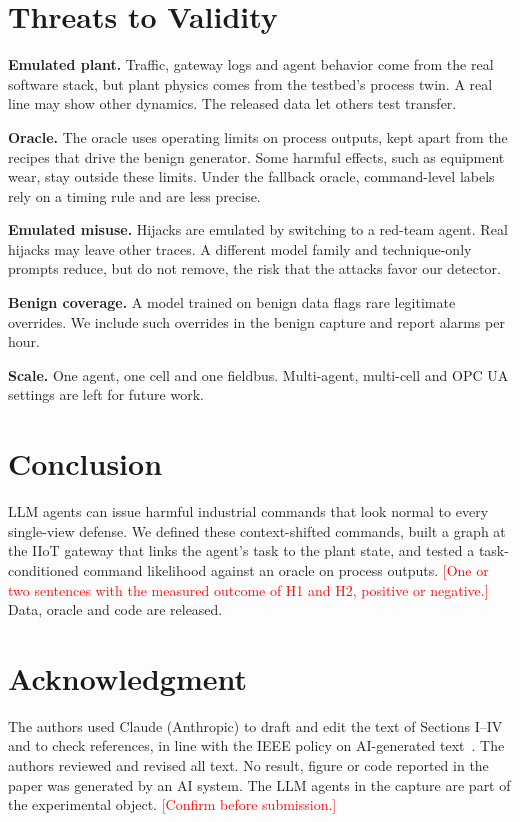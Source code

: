 \documentclass[journal]{IEEEtran}
\newcommand{\billal}[1]{\textcolor{red}{#1}}
\begin{document}
\section{Threats to Validity}\label{sec:discussion}
\textbf{Emulated plant.} Traffic, gateway logs and agent behavior come from the real software stack, but plant physics comes from the testbed's process twin. A real line may show other dynamics. The released data let others test transfer.

\textbf{Oracle.} The oracle uses operating limits on process outputs, kept apart from the recipes that drive the benign generator. Some harmful effects, such as equipment wear, stay outside these limits. Under the fallback oracle, command-level labels rely on a timing rule and are less precise.

\textbf{Emulated misuse.} Hijacks are emulated by switching to a red-team agent. Real hijacks may leave other traces. A different model family and technique-only prompts reduce, but do not remove, the risk that the attacks favor our detector.

\textbf{Benign coverage.} A model trained on benign data flags rare legitimate overrides. We include such overrides in the benign capture and report alarms per hour.

\textbf{Scale.} One agent, one cell and one fieldbus. Multi-agent, multi-cell and OPC UA settings are left for future work.

\section{Conclusion}\label{sec:conclusion}
LLM agents can issue harmful industrial commands that look normal to every single-view defense. We defined these context-shifted commands, built a graph at the IIoT gateway that links the agent's task to the plant state, and tested a task-conditioned command likelihood against an oracle on process outputs. \billal{[One or two sentences with the measured outcome of H1 and H2, positive or negative.]} Data, oracle and code are released.

\section*{Acknowledgment}
The authors used Claude (Anthropic) to draft and edit the text of Sections I--IV and to check references, in line with the IEEE policy on AI-generated text~\cite{ieee2026aipolicy}. The authors reviewed and revised all text. No result, figure or code reported in the paper was generated by an AI system. The LLM agents in the capture are part of the experimental object. \billal{[Confirm before submission.]}
\end{document}
